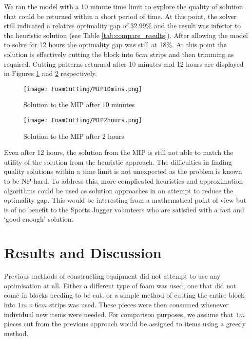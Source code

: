 \documentclass[10pt,a4paper]{article}
\begin{document}
We ran the model with a 10 minute time limit to explore the quality of solution that could be returned within a short period of time. At this point, the solver still indicated a relative optimality gap of 32.99\% and the result was inferior to the heuristic solution (see Table \ref{tab:compare_results}). After allowing the model to solve for 12 hours the optimality gap was still at 18\%. At this point the solution is effectively cutting the block into $6cm$ strips and then trimming as required. Cutting patterns returned after 10 minutes and 12 hours are displayed in Figures \ref{fig:10minsol} and \ref{fig:12hoursol} respectively.

\begin{figure}
\centering
\texttt{[image: FoamCutting/MIP10mins.png]} 
\caption{Solution to the MIP after 10 minutes}
\label{fig:10minsol}
\end{figure}

\begin{figure}
\centering
\texttt{[image: FoamCutting/MIP2hours.png]} 
\caption{Solution to the MIP after 2 hours}
\label{fig:12hoursol}
\end{figure}

Even after 12 hours, the solution from the MIP is still not able to match the utility of the solution from the heuristic approach. The difficulties in finding quality solutions within a time limit is not unexpected as the problem is known to be NP-hard. To address this, more complicated heuristics and approximation algorithms could be used as solution approaches in an attempt to reduce the optimality gap. This would be interesting from a mathematical point of view but is of no benefit to the Sports Jugger volunteers who are satisfied with a fast and `good enough' solution. 


\section{Results and Discussion}
\label{section:results}

Previous methods of constructing equipment did not attempt to use any optimisation at all. Either a different type of foam was used, one that did not come in blocks needing to be cut, or a simple method of cutting the entire block into $1m \times 6cm$ strips was used. These pieces were then consumed whenever individual new items were needed. For comparison purposes, we assume that $1m$ pieces cut from the previous approach would be assigned to items using a greedy method.
\end{document}
